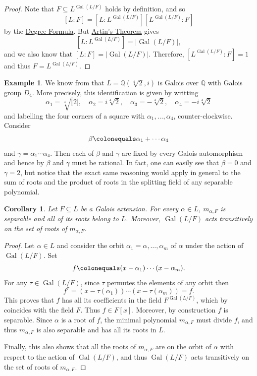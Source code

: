 \documentclass[12pt]{report}
\newtheorem{corollary}[theorem]{Corollary}
\numberwithin{equation}{section}
\numberwithin{theorem}{chapter}
\theoremstyle{definition}
\newtheorem{example}[theorem]{Example}
\newtheorem*{basic properties}{Basic Properties}
\newtheorem*{Important Remark}{Important Remark}
\DeclareMathOperator{\Gal}{Gal}
\newcommand{\Q}{\mathbb{Q}}
\begin{document}
\begin{proof} 
Note that $F \subseteq L^{\Gal(L/F)}$ holds by definition, and so 
$$[L:F] = [L: L^{\Gal(L/F)}][L^{\Gal(L/F)} : F]$$ 
by the \hyperref[deg formula]{Degree Formula}. But \hyperref[Artin's theorem]{Artin's Theorem} gives
$$[L: L^{\Gal(L/F)}] = |\Gal(L/F)|,$$ 
and we also know that $[L:F] = |\Gal(L/F)|$. Therefore, $[L^{\Gal(L/F)}:F] = 1$ and thus $F = L^{\Gal(L/F)}$.
\end{proof}


\begin{example} 
We know from  that $L = \Q(\sqrt[4]{2}, i)$ is Galois over $\Q$ with Galois group $D_4$. More precisely, this identification is given by writting 
$$\alpha_1 = \sqrt[4][2], \quad \alpha_2 = i\sqrt[4]{2}, \quad \alpha_3 = -\sqrt[4]{2}, \quad \alpha_4 = -i\sqrt[4]{2}$$ 
and labelling the four corners of a square with $\alpha_1, \ldots, \alpha_4$, counter-clockwise.  Consider 
$$\beta \colonequals \alpha_1 + \cdots \alpha_4$$ 
and $\gamma = \alpha_1 \cdots \alpha_4$. Then each of $\beta$ and $\gamma$ are fixed by every Galois automorphism and hence by  $\beta$ and $\gamma$ must be rational. In fact, one can easily see that $\beta = 0$ and $\gamma = 2$, but notice that the exact same reasoning would apply in general to the sum of roots and the product of roots in the splitting field of any separable polynomial.
\end{example}




\begin{corollary}\label{galois extension all min pols separable}
Let $F \subseteq L$ be a Galois extension.
For every $\alpha \in L$, $m_{\alpha, F}$ is separable and all of its roots belong to $L$. Moreover, $\Gal(L/F)$ acts transitively on the set of roots of $m_{\alpha,F}$.
\end{corollary}

\begin{proof}
Let $\alpha \in L$ and consider the orbit $\alpha_1 = \alpha, \ldots, \alpha_m$
of $\alpha$ under the action of $\Gal(L/F)$. Set
$$f \colonequals (x-\alpha_1) \cdots (x-\alpha_m).$$
For any $\tau \in \Gal(L/F)$, since $\tau$ permutes the elements of any orbit then
$$f^\tau = (x-\tau(\alpha_1)) \cdots (x-\tau(\alpha_m)) = f.$$
This proves that $f$ has all its coefficients in the field $F^{\Gal(L/F)}$, which by  coincides with the field $F$.
Thus $f \in F[x]$. Moreover, by construction $f$ is separable. Since $\alpha$ is a root of $f$, the minimal polynomial $m_{\alpha,F}$ must divide $f$, and thus $m_{\alpha,F}$ is also separable and has all its roots in $L$.

Finally, this also shows that all the roots of $m_{\alpha,F}$ are on the orbit of $\alpha$ with respect to the action of $\Gal(L/F)$, and thus $\Gal(L/F)$ acts transitively on the set of roots of $m_{\alpha,F}$.
\end{proof}
\end{document}
